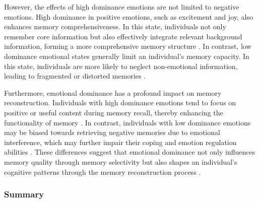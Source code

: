 However, the effects of high dominance emotions are not limited to negative emotions. High dominance in positive emotions, such as excitement and joy, also enhances memory comprehensiveness. In this state, individuals not only remember core information but also effectively integrate relevant background information, forming a more comprehensive memory structure \cite{fredrickson2001role}. In contrast, low dominance emotional states generally limit an individual’s memory capacity. In this state, individuals are more likely to neglect non-emotional information, leading to fragmented or distorted memories \cite{schacter2007cognitive}.

Furthermore, emotional dominance has a profound impact on memory reconstruction. Individuals with high dominance emotions tend to focus on positive or useful content during memory recall, thereby enhancing the functionality of memory \cite{fredrickson2001role, schacter2007cognitive}. In contrast, individuals with low dominance emotions may be biased towards retrieving negative memories due to emotional interference, which may further impair their coping and emotion regulation abilities \cite{anderson2001lesions, ledoux2000emotion}. These differences suggest that emotional dominance not only influences memory quality through memory selectivity but also shapes an individual’s cognitive patterns through the memory reconstruction process \cite{bower1981mood, schacter2007cognitive}.


\subsubsection{Summary}

